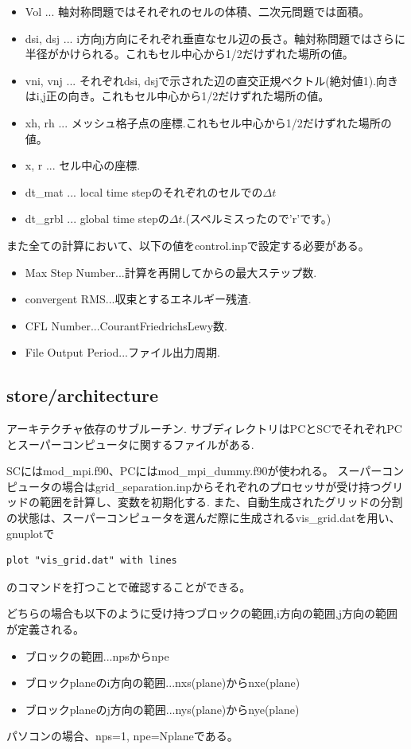 \documentclass{jsarticle}
\begin{document}
\begin{itemize}
\begin{itemize}
\item Vol ... 軸対称問題ではそれぞれのセルの体積、二次元問題では面積。
\item dsi, dsj ... i方向j方向にそれぞれ垂直なセル辺の長さ。軸対称問題ではさらに半径がかけられる。これもセル中心から1/2だけずれた場所の値。
\item vni, vnj ... それぞれdsi, dsjで示された辺の直交正規ベクトル(絶対値1).向きはi,j正の向き。これもセル中心から1/2だけずれた場所の値。
\item xh, rh ... メッシュ格子点の座標.これもセル中心から1/2だけずれた場所の値。
\item x, r ... セル中心の座標.
\item dt\_mat ... local time stepのそれぞれのセルでの$\Delta t$
\item dt\_grbl ... global time stepの$\Delta t$.(スペルミスったので'r'です。)
\end{itemize}
\end{itemize}
また全ての計算において、以下の値をcontrol.inpで設定する必要がある。
\begin{itemize}
\item Max Step Number...計算を再開してからの最大ステップ数.
\item convergent RMS...収束とするエネルギー残渣.
\item CFL Number...CourantFriedrichsLewy数.
\item File Output Period...ファイル出力周期.
\end{itemize}
\subsection{store/architecture}%
アーキテクチャ依存のサブルーチン.
サブディレクトリはPCとSCでそれぞれPCとスーパーコンピュータに関するファイルがある.

SCにはmod\_mpi.f90、PCにはmod\_mpi\_dummy.f90が使われる。
スーパーコンピュータの場合はgrid\_separation.inpからそれぞれのプロセッサが受け持つグリッドの範囲を計算し、変数を初期化する.
また、自動生成されたグリッドの分割の状態は、スーパーコンピュータを選んだ際に生成されるvis\_grid.datを用い、gnuplotで
\begin{verbatim}
plot "vis_grid.dat" with lines
\end{verbatim}
のコマンドを打つことで確認することができる。

どちらの場合も以下のように受け持つブロックの範囲,i方向の範囲,j方向の範囲が定義される。
\begin{itemize}
\item ブロックの範囲...npsからnpe
\item ブロックplaneのi方向の範囲...nxs(plane)からnxe(plane)
\item ブロックplaneのj方向の範囲...nys(plane)からnye(plane)
\end{itemize}
パソコンの場合、nps=1, npe=Nplaneである。
\end{document}
